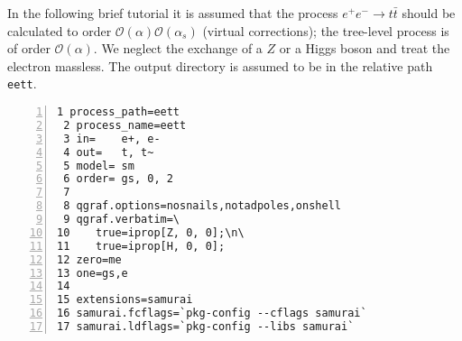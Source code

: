 \documentclass[11pt,a4paper]{refrep}
\begin{document}
In the following brief tutorial it is assumed that the process
$e^+e^-\rightarrow t\bar{t}$ should be calculated to order
$\mathcal{O}(\alpha)\mathcal{O}(\alpha_s)$ (virtual corrections);
the tree-level process is of order $\mathcal{O}(\alpha)$. We neglect
the exchange of a $Z$ or a Higgs boson and treat the electron massless.
The output directory is assumed to be in the relative path
\texttt{eett}.

\begin{lstlisting}[gobble=3,%
     numbers=left,caption={{\tt eett.in}},%
     basicstyle=\ttfamily]
 1 process_path=eett
 2 process_name=eett
 3 in=    e+, e-
 4 out=   t, t~
 5 model= sm
 6 order= gs, 0, 2
 7 
 8 qgraf.options=nosnails,notadpoles,onshell
 9 qgraf.verbatim=\
10    true=iprop[Z, 0, 0];\n\
11    true=iprop[H, 0, 0];
12 zero=me
13 one=gs,e
14
15 extensions=samurai
16 samurai.fcflags=`pkg-config --cflags samurai`
17 samurai.ldflags=`pkg-config --libs samurai`
\end{lstlisting}
\end{document}
